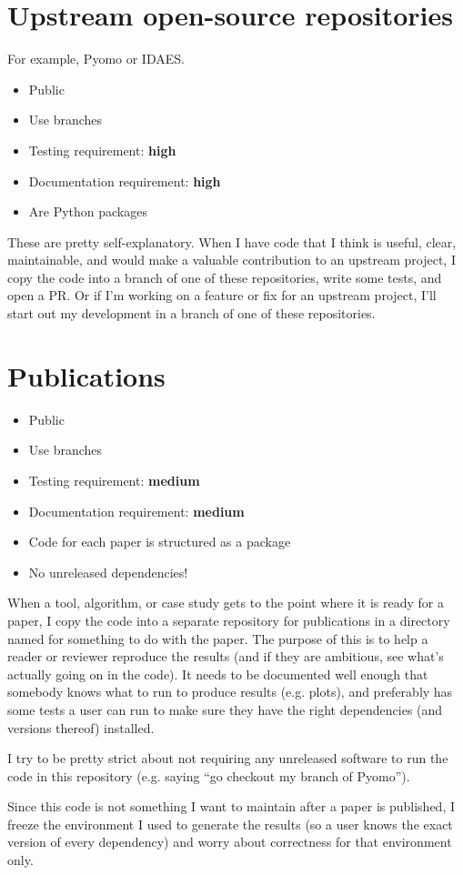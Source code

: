 \documentclass{article}
\begin{document}
\section{Upstream open-source repositories}
For example, Pyomo or IDAES.
\begin{itemize}
  \item Public
  \item Use branches
  \item Testing requirement: {\color{red}\bf high}
  \item Documentation requirement: {\color{red}\bf high}
  \item Are Python packages
\end{itemize}

These are pretty self-explanatory. When I have code that I think
is useful, clear, maintainable, and would make a valuable
contribution to an upstream project, I copy the code into a branch
of one of these repositories, write some tests, and open a PR.
Or if I'm working on a feature or fix for an upstream project,
I'll start out my development in a branch of one of these
repositories.

\section{Publications}
\begin{itemize}
  \item Public
  \item Use branches
  \item Testing requirement: {\color{purple}\bf medium}
  \item Documentation requirement: {\color{purple}\bf medium}
  \item Code for each paper is structured as a package
  \item No unreleased dependencies!
\end{itemize}

When a tool, algorithm, or case study gets to the point where it is
ready for a paper, I copy the code into a separate repository for
publications in a directory named for something to do with the paper.
The purpose of this is to help a reader or reviewer reproduce the
results (and if they are ambitious, see what's actually going on
in the code).
It needs to be documented well enough that somebody knows what to run
to produce results (e.g. plots), and preferably has some tests a
user can run to make sure they have the right dependencies
(and versions thereof) installed.

I try to be pretty strict about not requiring any unreleased software
to run the code in this repository (e.g. saying ``go checkout my branch
of Pyomo'').

Since this code is not something I want to maintain after a paper is
published, I freeze the environment I used to generate the results
(so a user knows the exact version of every dependency)
and worry about correctness for that environment only.
\end{document}
